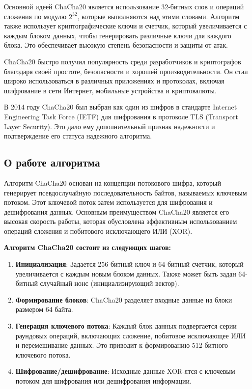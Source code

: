\documentclass[12pt]{article}
\begin{document}
    Основной идеей ChaCha20 является использование 32-битных слов и операций сложения по модулю $2^{32}$, которые выполняются над этими словами.
    Алгоритм также использует криптографические ключи и счетчик, который увеличивается с каждым блоком данных, чтобы генерировать различные ключи для каждого блока.
    Это обеспечивает высокую степень безопасности и защиты от атак.

    ChaCha20 быстро получил популярность среди разработчиков и криптографов благодаря своей простоте, безопасности и хорошей производительности.
    Он стал широко использоваться в различных приложениях и протоколах, включая шифрование в сети Интернет, мобильные устройства и криптовалюты.

    В 2014 году ChaCha20 был выбран как один из шифров в стандарте Internet Engineering Task Force (IETF) для шифрования в протоколе TLS (Transport Layer Security).
    Это дало ему дополнительный признак надежности и подтверждение его статуса надежного алгоритма.

    \subsection{О работе алгоритма}
    Алгоритм ChaCha20 основан на концепции потокового шифра, который генерирует псевдослучайную последовательность байтов, называемых ключевым потоком.
    Этот ключевой поток затем используется для шифрования и дешифрования данных.
    Основным преимуществом ChaCha20 является его высокая скорость работы, которая обусловлена эффективным использованием операций сложения и побитового исключающего ИЛИ (XOR).

    \textbf{Алгоритм ChaCha20 состоит из следующих шагов:}

    \begin{enumerate}
        \item \textbf{Инициализация}: Задается 256-битный ключ и 64-битный счетчик, который увеличивается с каждым новым блоком данных.
        Также может быть задан 64-битный случайный нонс (инициализирующий вектор).
        \item \textbf{Формирование блоков}: ChaCha20 разделяет входные данные на блоки размером 64 байта.
        \item \textbf{Генерация ключевого потока}: Каждый блок данных подвергается серии раундовых операций, включающих сложение, побитовое исключающее ИЛИ и перемешивание данных.
        Это приводит к формированию 512-битного ключевого потока.
        \item \textbf{Шифрование/дешифрование}: Исходные данные XOR-ятся с ключевым потоком для шифрования или дешифрования информации.
    \end{enumerate}
\end{document}

